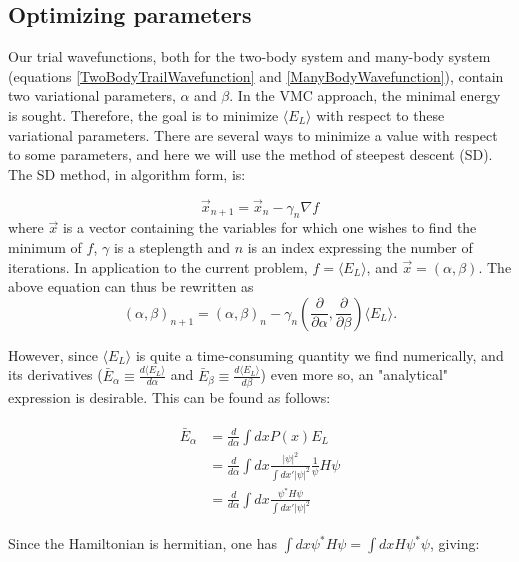 \documentclass[english, a4paper]{article}
\newcommand\lr[1]{\left(#1\right)}
\begin{document}
	
	
	\subsection{Optimizing parameters}
	Our trial wavefunctions, both for the two-body system and many-body system (equations \ref{TwoBodyTrailWavefunction} and \ref{ManyBodyWavefunction}), contain two variational parameters, $\alpha$ and $\beta$.
	In the VMC approach, the minimal energy is sought. Therefore, the goal is to minimize $\langle E_L\rangle$ with respect to these variational parameters.
	There are several ways to minimize a value with respect to some parameters, and here we will use the method of steepest descent (SD). The SD method, in algorithm form, is:
	
	\begin{equation}
		\vec{x}_{n+1} = \vec{x}_n - \gamma_n\nabla f
	\end{equation}
	where $\vec{x}$ is a vector containing the variables for which one wishes to find the minimum of $f$, $\gamma$ is a steplength and $n$ is an index expressing the number of iterations. In application to the current problem, $f = \langle E_L\rangle$, and $\vec{x}=\lr{\alpha, \beta}$. The above equation can thus be rewritten as
	\begin{equation}
	\lr{\alpha, \beta}_{n+1} = \lr{\alpha, \beta}_n - \gamma_n(\frac{\partial}{\partial \alpha}, \frac{\partial}{\partial \beta})  \langle E_L\rangle. \label{optimizationAlgo}
	\end{equation}
	
	 However, since $\langle E_L\rangle$ is quite a time-consuming quantity we find numerically, and its derivatives ($\bar{E}_\alpha \equiv \frac{d\langle E_L\rangle}{d\alpha}$ and $\bar{E}_\beta \equiv \frac{d\langle E_L\rangle}{d\beta}$) even more so, an "analytical" expression is desirable. This can be found as follows:
	
	\begin{align}
	\begin{split}
	\bar{E}_\alpha &= \frac{d}{d\alpha}\int dx P(x) E_L\\
	&= \frac{d}{d\alpha}\int dx \frac{|\psi|^2}{\int dx'|\psi|^2}\frac{1}{\psi}H\psi\\
	&= \frac{d}{d\alpha}\int dx \frac{\psi^*H\psi}{\int dx'|\psi|^2}
	\end{split}
	\end{align}
	
	Since the Hamiltonian is hermitian, one has $\int dx\psi^* H \psi = \int dx H\psi^*\psi$, giving:
	
\end{document}
